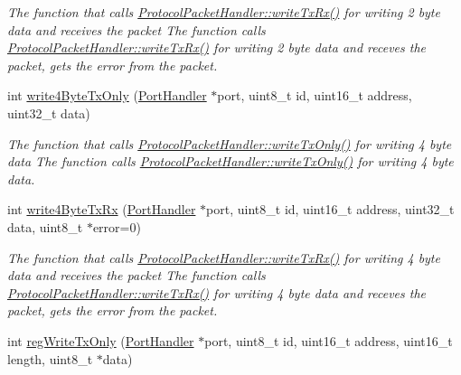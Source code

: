 \begin{DoxyCompactItemize}
\begin{DoxyCompactList}\small\item\em The function that calls \hyperlink{classmercury_1_1_protocol_packet_handler_a13921f2ddae0c1f1f7ac3669d1a15470}{Protocol\+Packet\+Handler\+::write\+Tx\+Rx()} for writing 2 byte data and receives the packet  The function calls \hyperlink{classmercury_1_1_protocol_packet_handler_a13921f2ddae0c1f1f7ac3669d1a15470}{Protocol\+Packet\+Handler\+::write\+Tx\+Rx()} for writing 2 byte data and receves the packet,  gets the error from the packet. \end{DoxyCompactList}\item 
int \hyperlink{classmercury_1_1_protocol_packet_handler_a88c64703e5947188e7c83d57dd2a8ffc}{write4\+Byte\+Tx\+Only} (\hyperlink{classmercury_1_1_port_handler}{Port\+Handler} $\ast$port, uint8\+\_\+t id, uint16\+\_\+t address, uint32\+\_\+t data)
\begin{DoxyCompactList}\small\item\em The function that calls \hyperlink{classmercury_1_1_protocol_packet_handler_adf6e96b412135484dac0ff7ff9c2bf36}{Protocol\+Packet\+Handler\+::write\+Tx\+Only()} for writing 4 byte data  The function calls \hyperlink{classmercury_1_1_protocol_packet_handler_adf6e96b412135484dac0ff7ff9c2bf36}{Protocol\+Packet\+Handler\+::write\+Tx\+Only()} for writing 4 byte data. \end{DoxyCompactList}\item 
int \hyperlink{classmercury_1_1_protocol_packet_handler_abdcdc58ceead4033768386c5de3eb066}{write4\+Byte\+Tx\+Rx} (\hyperlink{classmercury_1_1_port_handler}{Port\+Handler} $\ast$port, uint8\+\_\+t id, uint16\+\_\+t address, uint32\+\_\+t data, uint8\+\_\+t $\ast$error=0)
\begin{DoxyCompactList}\small\item\em The function that calls \hyperlink{classmercury_1_1_protocol_packet_handler_a13921f2ddae0c1f1f7ac3669d1a15470}{Protocol\+Packet\+Handler\+::write\+Tx\+Rx()} for writing 4 byte data and receives the packet  The function calls \hyperlink{classmercury_1_1_protocol_packet_handler_a13921f2ddae0c1f1f7ac3669d1a15470}{Protocol\+Packet\+Handler\+::write\+Tx\+Rx()} for writing 4 byte data and receves the packet,  gets the error from the packet. \end{DoxyCompactList}\item 
int \hyperlink{classmercury_1_1_protocol_packet_handler_af43e9f53d3e295b12b69f4b99c8c1746}{reg\+Write\+Tx\+Only} (\hyperlink{classmercury_1_1_port_handler}{Port\+Handler} $\ast$port, uint8\+\_\+t id, uint16\+\_\+t address, uint16\+\_\+t length, uint8\+\_\+t $\ast$data)

\end{DoxyCompactItemize}
